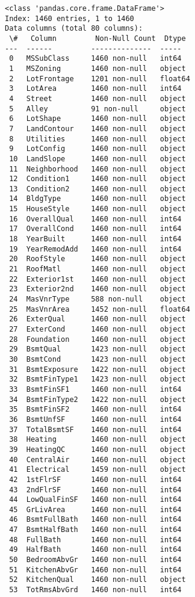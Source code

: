 \documentclass[11pt]{article}
\begin{document}
    \begin{Verbatim}[commandchars=\\\{\}]
<class 'pandas.core.frame.DataFrame'>
Index: 1460 entries, 1 to 1460
Data columns (total 80 columns):
 \#   Column         Non-Null Count  Dtype
---  ------         --------------  -----
 0   MSSubClass     1460 non-null   int64
 1   MSZoning       1460 non-null   object
 2   LotFrontage    1201 non-null   float64
 3   LotArea        1460 non-null   int64
 4   Street         1460 non-null   object
 5   Alley          91 non-null     object
 6   LotShape       1460 non-null   object
 7   LandContour    1460 non-null   object
 8   Utilities      1460 non-null   object
 9   LotConfig      1460 non-null   object
 10  LandSlope      1460 non-null   object
 11  Neighborhood   1460 non-null   object
 12  Condition1     1460 non-null   object
 13  Condition2     1460 non-null   object
 14  BldgType       1460 non-null   object
 15  HouseStyle     1460 non-null   object
 16  OverallQual    1460 non-null   int64
 17  OverallCond    1460 non-null   int64
 18  YearBuilt      1460 non-null   int64
 19  YearRemodAdd   1460 non-null   int64
 20  RoofStyle      1460 non-null   object
 21  RoofMatl       1460 non-null   object
 22  Exterior1st    1460 non-null   object
 23  Exterior2nd    1460 non-null   object
 24  MasVnrType     588 non-null    object
 25  MasVnrArea     1452 non-null   float64
 26  ExterQual      1460 non-null   object
 27  ExterCond      1460 non-null   object
 28  Foundation     1460 non-null   object
 29  BsmtQual       1423 non-null   object
 30  BsmtCond       1423 non-null   object
 31  BsmtExposure   1422 non-null   object
 32  BsmtFinType1   1423 non-null   object
 33  BsmtFinSF1     1460 non-null   int64
 34  BsmtFinType2   1422 non-null   object
 35  BsmtFinSF2     1460 non-null   int64
 36  BsmtUnfSF      1460 non-null   int64
 37  TotalBsmtSF    1460 non-null   int64
 38  Heating        1460 non-null   object
 39  HeatingQC      1460 non-null   object
 40  CentralAir     1460 non-null   object
 41  Electrical     1459 non-null   object
 42  1stFlrSF       1460 non-null   int64
 43  2ndFlrSF       1460 non-null   int64
 44  LowQualFinSF   1460 non-null   int64
 45  GrLivArea      1460 non-null   int64
 46  BsmtFullBath   1460 non-null   int64
 47  BsmtHalfBath   1460 non-null   int64
 48  FullBath       1460 non-null   int64
 49  HalfBath       1460 non-null   int64
 50  BedroomAbvGr   1460 non-null   int64
 51  KitchenAbvGr   1460 non-null   int64
 52  KitchenQual    1460 non-null   object
 53  TotRmsAbvGrd   1460 non-null   int64

\end{Verbatim}
\end{document}
